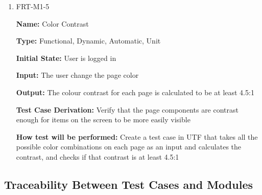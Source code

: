 \documentclass[12pt, titlepage]{article}
\begin{document}
\begin{enumerate}
\item{FRT-M1-5}

\textbf{Name:} Color Contrast

\textbf{Type:} Functional, Dynamic, Automatic, Unit
					
\textbf{Initial State:} User is logged in
					
\textbf{Input:} The user change the page color
					
\textbf{Output:} The colour contrast for each page is  calculated to be at least 4.5:1

\textbf{Test Case Derivation:} Verify that the page components are contrast enough for items on the screen to be more easily visible

\textbf{How test will be performed:} Create a test case in UTF that takes all the possible color combinations on each page as an input and calculates the contrast, and checks if that contrast is at least 4.5:1
\end{enumerate}

\subsection{Traceability Between Test Cases and Modules}
\end{document}
